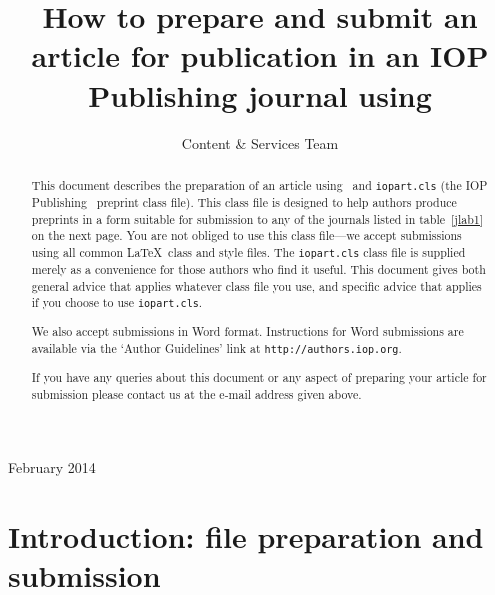 \documentclass[12pt]{iopart}
\begin{document}
\title[Author guidelines for IOP Publishing journals in  \LaTeXe]{How to prepare and submit an article for 
publication in an IOP Publishing journal using \LaTeXe}

\author{Content \& Services Team}

\address{IOP Publishing, Temple Circus, Temple Way, Bristol BS1 6HG, UK}
\vspace{10pt}
\begin{indented}
\item[]February 2014
\end{indented}

\begin{abstract}
This document describes the  preparation of an article using \LaTeXe\ and 
\verb"iopart.cls" (the IOP Publishing \LaTeXe\ preprint class file).
This class file is designed to help 
authors produce preprints in a form suitable for submission to any of the
journals listed in table~\ref{jlab1} on the next page.  You are not obliged to use this class file---we accept
submissions using all common \LaTeX\ class and style files.  The \verb"iopart.cls"
class file is supplied merely as a convenience for those authors who find it useful.
This document gives both general advice that applies whatever class file you use, and specific advice
that applies if you choose to use \verb"iopart.cls".

We also accept submissions in Word format.  Instructions for Word submissions are available via the `Author Guidelines' link at \verb"http://authors.iop.org".

If you have any queries about this document or any aspect of preparing your article for submission please contact us at the e-mail address given above.
\end{abstract}

%
%
%
% 
%



\section{Introduction: file preparation and submission}
\end{document}
